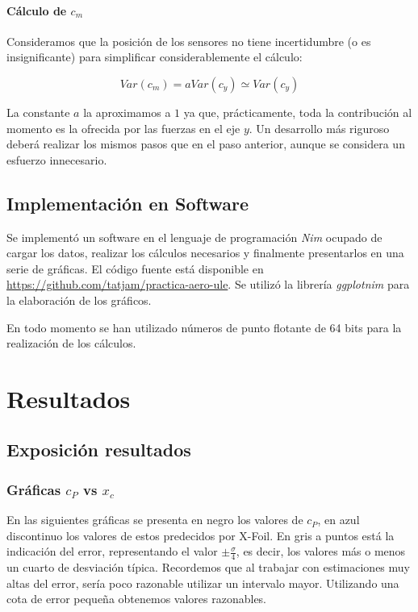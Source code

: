 \documentclass{article}
\begin{document}
\paragraph{Cálculo de $c_m$}

Consideramos que la posición de los sensores no tiene incertidumbre (o es insignificante)
para simplificar considerablemente el cálculo:

$$Var(c_m) = a Var(c_y) \simeq Var(c_y)$$

La constante $a$ la aproximamos a $1$ ya que, prácticamente, toda la contribución al momento es la ofrecida 
por las fuerzas en el eje $y$. Un desarrollo más riguroso deberá realizar los mismos pasos que en el paso anterior, aunque 
se considera un esfuerzo innecesario.


\subsection{Implementación en Software}

Se implementó un software en el lenguaje de programación \textit{Nim} ocupado de cargar los datos, realizar los cálculos
necesarios y finalmente presentarlos en una serie de gráficas. El código fuente está disponible en 
\url{https://github.com/tatjam/practica-aero-ule}. Se utilizó la librería \textit{ggplotnim} para la elaboración
de los gráficos.

En todo momento se han utilizado números de punto flotante de 64 bits para la realización de los cálculos.

\newpage
\section{Resultados}

\subsection{Exposición resultados}

\subsubsection{Gráficas \texorpdfstring{$c_P$}{presión} vs \texorpdfstring{$x_c$}{posición}}

\label{cp}

En las siguientes gráficas se presenta en negro los valores de $c_P$, en azul discontinuo los valores de estos 
predecidos por X-Foil. En gris a puntos está la indicación del error, representando el valor $\pm \frac{\sigma}{4}$, es decir,
los valores más o menos un cuarto de desviación típica. Recordemos que al trabajar con estimaciones muy altas del error, sería poco 
razonable utilizar un intervalo mayor. Utilizando una cota de error pequeña obtenemos valores razonables. 
\end{document}
